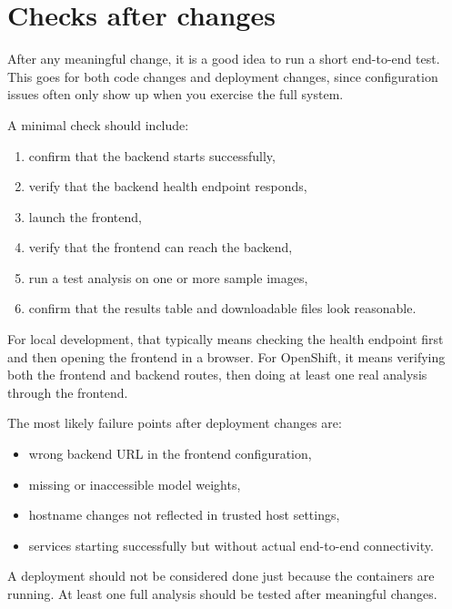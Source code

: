 \documentclass{article}
\begin{document}
\section{Checks after changes}

After any meaningful change, it is a good idea to run a short end-to-end test. This goes for both code changes and deployment changes, since configuration issues often only show up when you exercise the full system.

A minimal check should include:

\begin{enumerate}
    \item confirm that the backend starts successfully,
    \item verify that the backend health endpoint responds,
    \item launch the frontend,
    \item verify that the frontend can reach the backend,
    \item run a test analysis on one or more sample images,
    \item confirm that the results table and downloadable files look reasonable.
\end{enumerate}

For local development, that typically means checking the health endpoint first and then opening the frontend in a browser. For OpenShift, it means verifying both the frontend and backend routes, then doing at least one real analysis through the frontend.

The most likely failure points after deployment changes are:

\begin{itemize}
    \item wrong backend URL in the frontend configuration,
    \item missing or inaccessible model weights,
    \item hostname changes not reflected in trusted host settings,
    \item services starting successfully but without actual end-to-end connectivity.
\end{itemize}

A deployment should not be considered done just because the containers are running. At least one full analysis should be tested after meaningful changes.
\end{document}
